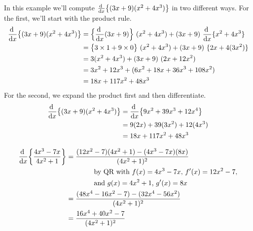\begin{eg}\label{eg:DIFFsimpleToolsE}
In this example we'll compute $\diff{}{x}\big\{(3x+9)(x^2+4x^3)\big\}$
in two different ways. For the first, we'll start with the product rule.
\begin{align*}
\diff{}{x}\big\{(3x+9)(x^2+4x^3)\big\}
&=\Big\{\diff{}{x}(3x+9)\Big\}\ (x^2+4x^3)
   +(3x+9)\ \diff{}{x}\{x^2+4x^3\}\\
&=\big\{3\times 1+9\times 0\big\}\ (x^2+4x^3)
   +(3x+9)\ \{2x+4(3x^2)\}\\
&=3(x^2+4x^3)+(3x+9)\ (2x+12x^2)\\
&=3x^2+12x^3+(6x^2+18x+36x^3+108x^2)\\
&=18x+117x^2+48x^3
\end{align*}
For the second, we expand the product first and then differentiate.
\begin{align*}
\diff{}{x}\big\{(3x+9)(x^2+4x^3)\big\}
&=\diff{}{x}\big\{9x^2+39x^3+12x^4\big\}\\
&=9(2x)+39(3x^2)+12(4x^3)\\
&=18x+117x^2+48x^3
\end{align*}
\end{eg}

\goodbreak
\begin{eg}\label{eg:DIFFsimpleToolsH} 
\begin{align*}
\diff{}{x}\bigg\{\frac{4x^3-7x}{4x^2+1}\bigg\}
&=\frac{(12x^2-7)(4x^2+1)-(4x^3-7x)(8x)}{(4x^2+1)^2} \\
   &\qquad\qquad\text{by \quot\ with $f(x)=4x^3-7x$, $f'(x)=12x^2-7$,} \\
   &\qquad\qquad\text{and  $g(x)=4x^2+1$, $g'(x)=8x$} \\
&=\frac{(48x^4-16x^2-7)-(32x^4-56x^2)}{(4x^2+1)^2} \\
&=\frac{16x^4+40 x^2-7}{(4x^2+1)^2}
\end{align*}
\end{eg}


